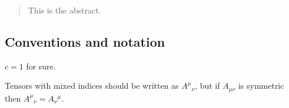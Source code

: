 \documentclass[main.tex]{subfiles}
\begin{document}
\begin{abstract}
This is the abstract.   
\end{abstract}

\subsection*{Conventions and notation}

\(c=1\) for sure.

Tensors with mixed indices should be written as \(A^{\mu }{}_{\nu }\), but if \(A_{\mu \nu }\) is symmetric then \(A^{\mu }{}_\nu = A_\nu {}^{\mu }\). 
\end{document}
